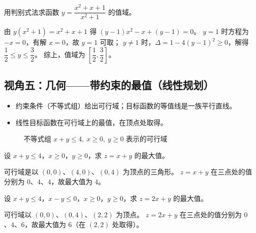 \begin{explore}
\begin{problem}
用判别式法求函数 $y=\dfrac{x^2+x+1}{x^2+1}$ 的值域。
\end{problem}
\begin{solution}
由 $y(x^2+1)=x^2+x+1$ 得 $(y-1)x^2-x+(y-1)=0$。
$y=1$ 时方程为 $-x=0$，有解 $x=0$，故 $y=1$ 可取；
$y\neq1$ 时，$\Delta=1-4(y-1)^2\geq0$，解得 $\dfrac12\leq y\leq\dfrac32$。
综上，值域为 $\left[\dfrac12,\dfrac32\right]$。
\end{solution}


\subsection{视角五：几何——带约束的最值（线性规划）}

\begin{itemize}
  \item 约束条件（不等式组）给出可行域；目标函数的等值线是一族平行直线。
  \item 线性目标函数在可行域上的最值，在顶点处取得。
\end{itemize}

\begin{figure}[htbp]
  \centering
  \caption{不等式组 $x+y\leq4,\ x\geq0,\ y\geq0$ 表示的可行域}
\end{figure}

\begin{example}
设 $x+y\leq4$，$x\geq0$，$y\geq0$，求 $z=x+y$ 的最大值。
\end{example}
\begin{solution}
可行域是以 $(0,0)$、$(4,0)$、$(0,4)$ 为顶点的三角形。
$z=x+y$ 在三点处的值分别为 $0$、$4$、$4$，故最大值为 $4$。
\end{solution}

\begin{problem}
设 $x+y\leq4$，$x-y\leq0$，$x\geq0$，$y\geq0$，求 $z=2x+y$ 的最大值。
\end{problem}
\begin{solution}
可行域以 $(0,0)$、$(0,4)$、$(2,2)$ 为顶点。
$z=2x+y$ 在三点处的值分别为 $0$、$4$、$6$，故最大值为 $6$（在 $(2,2)$ 处取得）。
\end{solution}

\end{explore}

